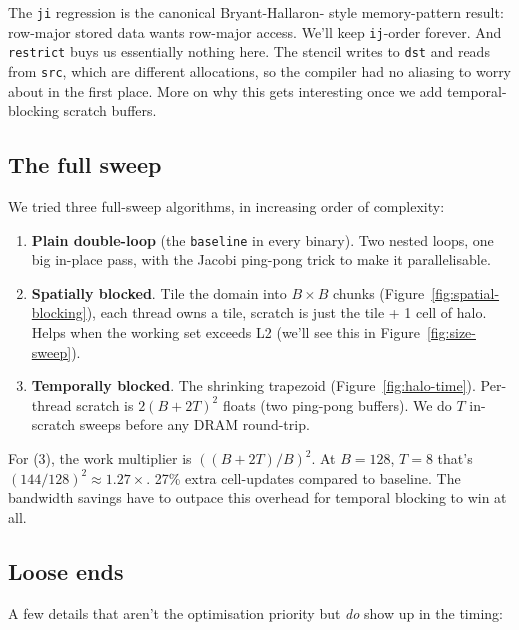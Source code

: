\documentclass[11pt]{article}
\begin{document}
\noindent The \texttt{ji} regression is the canonical Bryant-Hallaron-
style memory-pattern result: row-major stored data wants row-major
access.  We'll keep \texttt{ij}-order forever.  And \texttt{restrict}
buys us essentially nothing here. The stencil writes to \texttt{dst}
and reads from \texttt{src}, which are different allocations, so the
compiler had no aliasing to worry about in the first place.  More on
why this gets interesting once we add temporal-blocking scratch
buffers.

\subsection{The full sweep}

We tried three full-sweep algorithms, in increasing order of
complexity:

\begin{enumerate}[leftmargin=1.4em,itemsep=2pt,topsep=2pt]
  \item \textbf{Plain double-loop} (the \texttt{baseline} in every
        binary).  Two nested loops, one big in-place pass, with the
        Jacobi ping-pong trick to make it parallelisable.
  \item \textbf{Spatially blocked}. Tile the domain into $B{\times}B$
        chunks (Figure~\ref{fig:spatial-blocking}), each thread owns
        a tile, scratch is just the tile + 1 cell of halo.  Helps
        when the working set exceeds L2 (we'll see this in
        Figure~\ref{fig:size-sweep}).
  \item \textbf{Temporally blocked}. The shrinking trapezoid
        (Figure~\ref{fig:halo-time}).  Per-thread scratch is
        $2(B{+}2T)^2$ floats (two ping-pong buffers).  We do $T$
        in-scratch sweeps before any DRAM round-trip.
\end{enumerate}

\noindent For (3), the work multiplier is $((B{+}2T)/B)^2$.  At
$B{=}128$, $T{=}8$ that's $(144/128)^2 \approx 1.27\times$. 27\%
extra cell-updates compared to baseline.  The bandwidth savings have
to outpace this overhead for temporal blocking to win at all.

\subsection{Loose ends}

A few details that aren't the optimisation priority but \emph{do} show
up in the timing:
\end{document}
